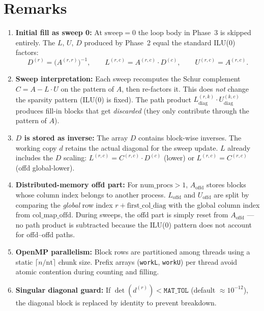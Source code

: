 \documentclass[11pt,a4paper]{article}
\begin{document}
\section{Remarks}

\begin{enumerate}
    \item \textbf{Initial fill as sweep 0:}
          At $\text{sweep}=0$ the loop body in Phase~3 is skipped entirely.
          The $L$, $U$, $D$ produced by Phase~2 equal the standard ILU(0) factors:
          \[
          D^{(r)} = \bigl(A^{(r,r)}\bigr)^{-1},\qquad
          L^{(r,c)} = A^{(r,c)} \cdot D^{(c)},\qquad
          U^{(r,c)} = A^{(r,c)} .
          \]

    \item \textbf{Sweep interpretation:}
          Each sweep recomputes the Schur complement
          $C = A - L \cdot U$ on the pattern of $A$, then re-factors it.
          This does \emph{not} change the sparsity pattern (ILU(0) is fixed).
          The path product $L_{\text{diag}}^{(r,k)} \cdot U_{\text{diag}}^{(k,c)}$
          produces fill-in blocks that get \emph{discarded} (they only contribute
          through the pattern of $A$).

    \item \textbf{$D$ is stored as inverse:}
          The array $D$ contains block-wise inverses.
          The working copy $d$ retains the actual diagonal for the sweep update.
          $L$ already includes the $D$ scaling:
          $L^{(r,c)} = C^{(r,c)} \cdot D^{(c)}$ (lower) or
          $L^{(r,c)} = C^{(r,c)}$ (offd global-lower).

    \item \textbf{Distributed-memory offd part:}
          For $\text{num\_procs} > 1$, $A_{\text{offd}}$ stores blocks whose
          column index belongs to another process.  $L_{\text{offd}}$ and
          $U_{\text{offd}}$ are split by comparing the \emph{global} row index
          $r + \text{first\_col\_diag}$ with the global column index from
          $\text{col\_map\_offd}$.  During sweeps, the offd part is simply
          reset from $A_{\text{offd}}$ --- no path product is subtracted because
          the ILU(0) pattern does not account for offd--offd paths.

    \item \textbf{OpenMP parallelism:}
          Block rows are partitioned among threads using a static
          $\lceil n / \text{nt}\rceil$ chunk size.  Prefix arrays
          (\texttt{workL}, \texttt{workU}) per thread avoid atomic contention
          during counting and filling.

    \item \textbf{Singular diagonal guard:}
          If $\det(d^{(r)}) < \mathtt{MAT\_TOL}$ (default $\approx 10^{-12}$),
          the diagonal block is replaced by identity to prevent breakdown.
\end{enumerate}
\end{document}
